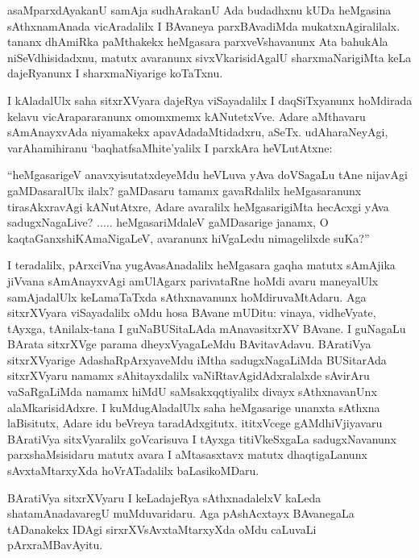 asaMparxdAyakanU samAja sudhArakanU Ada budadhxnu kUDa heMgasina sAthxnamAnada vicAradalilx I BAvaneya parxBAvadiMda mukatxnAgiralilalx. tananx dhAmiRka paMthakekx heMgasara parxveVshavanunx Ata bahukAla niSeVdhisidadxnu, matutx avaranunx sivxVkarisidAgalU sharxmaNarigiMta keLa dajeRyanunx I sharxmaNiyarige koTaTxnu.

I kAladalUlx saha sitxrXVyara dajeRya viSayadalilx I daqSiTxyanunx hoMdirada kelavu vicArapararanunx omomxmemx kANutetxVve. Adare aMthavaru sAmAnayxvAda niyamakekx apavAdadaMtidadxru, aSeTx. udAharaNeyAgi, varAhamihiranu  `baqhatfsaMhite'yalilx I parxkAra heVLutAtxne:

\begin{minipage}[c]{.5cm}
\quad
\end{minipage}
\begin{minipage}[c]{8.5cm}
``heMgasarigeV anavxyisutatxdeyeMdu heVLuva yAva doVSagaLu tAne nijavAgi gaMDasaralUlx ilalx? gaMDasaru tamamx gavaRdalilx heMgasaranunx tirasAkxravAgi kANutAtxre, Adare avaralilx heMgasarigiMta hecAcxgi yAva sadugxNagaLive? ..... heMgasariMdaleV gaMDasarige janamx, O kaqtaGanxshiKAmaNigaLeV, avaranunx hiVgaLedu nimagelilxde suKa?''
\end{minipage}

I teradalilx, pArxciVna yugAvasAnadalilx heMgasara gaqha matutx sAmAjika jiVvana sAmAnayxvAgi amUlAgarx parivataRne hoMdi avaru maneyalUlx samAjadalUlx keLamaTaTxda sAthxnavanunx hoMdiruvaMtAdaru. Aga sitxrXVyara viSayadalilx oMdu hosa BAvane mUDitu: vinaya, vidheVyate, tAyxga, tAnilalx-tana I guNaBUSitaLAda mAnavasitxrXV BAvane. I guNagaLu BArata sitxrXVge parama dheyxVyagaLeMdu BAvitavAdavu. BAratiVya sitxrXVyarige AdashaRpArxyaveMdu iMtha sadugxNagaLiMda BUSitarAda sitxrXVyaru namamx sAhitayxdalilx vaNiRtavAgidAdxralalxde sAvirAru vaSaRgaLiMda namamx hiMdU saMsakxqqtiyalilx divayx sAthxnavanUnx alaMkarisidAdxre. I kuMdugAladalUlx saha heMgasarige unanxta sAthxna laBisitutx, Adare idu beVreya taradAdxgitutx. ititxVcege gAMdhiVjiyavaru BAratiVya sitxVyaralilx goVcarisuva I tAyxga titiVkeSxgaLa sadugxNavanunx parxshaMsisidaru matutx avara I aMtasasxtavx matutx dhaqtigaLanunx sAvxtaMtarxyXda hoVrATadalilx baLasikoMDaru.

BAratiVya sitxrXVyaru I keLadajeRya sAthxnadalelxV kaLeda shatamAnadavaregU muMduvaridaru. Aga pAshAcxtayx BAvanegaLa tADanakekx IDAgi sirxrXVsAvxtaMtarxyXda oMdu caLuvaLi pArxraMBavAyitu.

